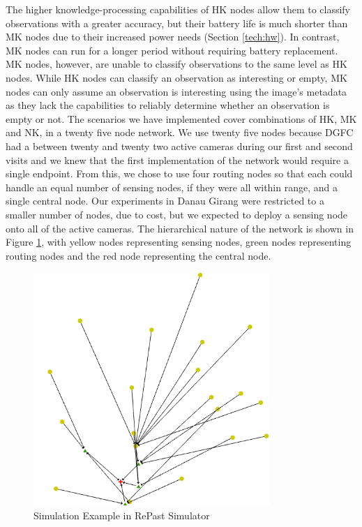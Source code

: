 The higher knowledge-processing capabilities of HK nodes allow them to classify observations with a greater accuracy, but their battery life is much shorter than MK nodes due to their increased power needs (Section \ref{tech:hw}). In contrast, MK nodes can run for a longer period without requiring battery replacement. MK nodes, however, are unable to classify observations to the same level as HK nodes. While HK nodes can classify an observation as interesting or empty, MK nodes can only assume an observation is interesting using the image's metadata as they lack the capabilities to reliably determine whether an observation is empty or not. The scenarios we have implemented cover combinations of HK, MK and NK, in a twenty five node network. We use twenty five nodes because DGFC had a between twenty and twenty two active cameras during our first and second visits and we knew that the first implementation of the network would require a single endpoint. From this, we chose to use four routing nodes so that each could handle an equal number of sensing nodes, if they were all within range, and a single central node. Our experiments in Danau Girang were restricted to a smaller number of nodes, due to cost, but we expected to deploy a sensing node onto all of the active cameras. The hierarchical nature of the network is shown in Figure \ref{fig:sim}, with yellow nodes representing sensing nodes, green nodes representing routing nodes and the red node representing the central node.

	\begin{figure}[h]
	\centering
	\includegraphics[width=0.8\textwidth]{Chap7/figures/khas_sim}
	\caption{Simulation Example in RePast Simulator}
	\label{fig:sim}
	\end{figure}

